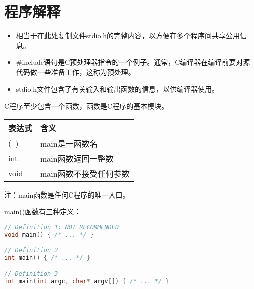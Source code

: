 \section{程序解释}
\begin{frame}



\begin{itemize}
\item
相当于在此处复制文件stdio.h的完整内容，以方便在多个程序间共享公用信息。\\[0.1in]
\item
\#include语句是C预处理器指令的一个例子。通常，C编译器在编译前要对源代码做一些准备工作，这称为预处理。
\\[0.1in]
\item
stdio.h文件包含了有关输入和输出函数的信息，以供编译器使用。
\end{itemize}
\end{frame}

\begin{frame}

 
C程序至少包含一个函数，函数是C程序的基本模块。\\[0.1in]
\begin{table}
\centering
\begin{tabular}{ll}
表达式 & 含义 \\ \hline
(~) & main是一函数名\\[0.1in]
int & main函数返回一整数\\[0.1in]
void & main函数不接受任何参数 \\ \hline
\end{tabular}
\end{table}
 
注：main函数是任何C程序的唯一入口。
\end{frame}

\begin{frame}[fragile]
main()函数有三种定义：
\begin{lstlisting}[language=c,frame=single]
// Definition 1: NOT RECOMMENDED
void main() { /* ... */ }

// Definition 2
int main() { /* ... */ }

// Definition 3
int main(int argc, char* argv[]) { /* ... */ }
\end{lstlisting}
\end{frame}

